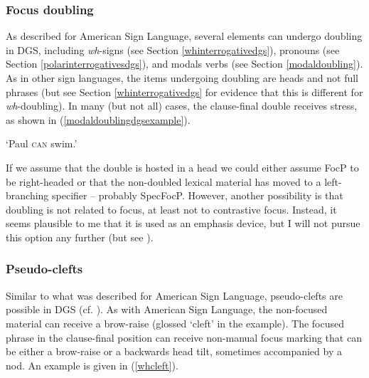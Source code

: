 \subsubsection{Focus doubling}
As described for American Sign Language, several elements can undergo doubling in DGS, including \textit{wh}-signs (see Section \ref{whinterrogativedgs}), pronouns (see Section \ref{polarinterrogativesdgs}), and modals verbs (see Section \ref{modaldoubling}). As in other sign languages, the items undergoing doubling are heads and not full phrases (but see Section \ref{whinterrogativedgs} for evidence that this is different for \textit{wh}-doubling). In many (but not all) cases, the clause-final double receives stress, as shown in (\ref{modaldoublingdgsexample}).

\begin{exe}
\ex {} 
\glt `Paul \textsc{can} swim.' \label{modaldoublingdgsexample}
\end{exe}

\noindent If we assume that the double is hosted in a head we could either assume FocP to be right-headed or that the non-doubled lexical material has moved to a left-branching specifier -- probably SpecFocP. However, another possibility is that doubling is not related to focus, at least not to contrastive focus. Instead, it seems plausible to me that it is used as an emphasis device, but I will not pursue this option any further (but see \citealt{wilbur2012informationstructure}).



\subsubsection{Pseudo-clefts}
Similar to what was described for American Sign Language, pseudo-clefts are possible in DGS (cf. \citealt[397]{happ2014vork}). As with American Sign Language, the non-focused material can receive a brow-raise (glossed `cleft' in the example). The focused phrase in the clause-final position can receive non-manual focus marking that can be either a brow-raise or a backwards head tilt, sometimes accompanied by a nod. An example is given in (\ref{whcleft}).%

